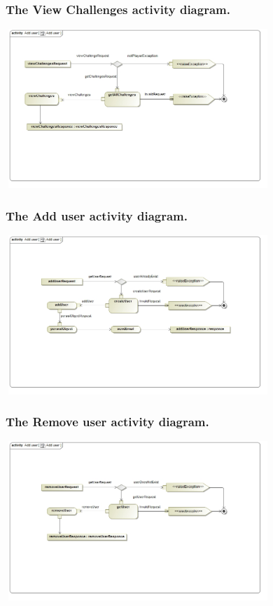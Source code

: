 \documentclass[english]{article}
\begin{document}
			\subsubsection* {The View Challenges activity diagram.}
			\includegraphics[width=10cm,height=6cm,keepaspectratio]{ViewChallenges.jpg}	
		
		 \subsubsection* {The Add user activity diagram.}
		 \includegraphics[width=10cm,height=6cm,keepaspectratio]{addUser1.jpg}	
		 
		 \subsubsection* {The Remove user activity diagram.}
		 \includegraphics[width=10cm,height=6cm,keepaspectratio]{RemoveUser1.jpg}	
		 
\end{document}
